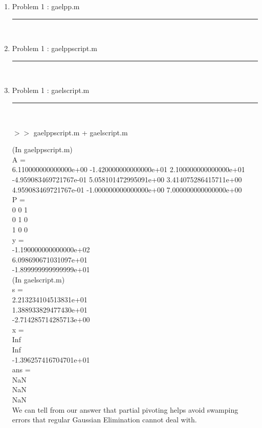 \documentclass[12pt]{article}
\newcommand*\lstinputpath[1]{\lstset{inputpath=#1}}
\begin{document}
	\begin{enumerate}
	
	\item[] Problem 1 : gaelpp.m \noindent\rule{\textwidth}{1.0pt} \\
	\lstinputpath{P1}
	
	
	\item[] Problem 1 : gaelppscript.m \noindent\rule{\textwidth}{1.0pt} \\
		
	
	\item[] Problem 1 : gaelscript.m \noindent\rule{\textwidth}{1.0pt} \\
		
	
	\pagebreak	
	
	$>>$ gaelppscript.m + gaelscript.m
	\begin{framed}
	(In gaelppscript.m)\\
	A =\\
     6.110000000000000e+00    -1.420000000000000e+01     2.100000000000000e+01\\
    -4.959083469721767e-01     5.058101472995091e+00     3.414075286415711e+00\\
     4.959083469721767e-01    -1.000000000000000e+00     7.000000000000000e+00\\


	P =\\
     0     0     1\\
     0     1     0\\
     1     0     0\\


	y =\\
    -1.190000000000000e+02\\
     6.098690671031097e+01\\
    -1.899999999999999e+01\\

(In gaelscript.m)\\
	s =\\
     2.213234104513831e+01\\
     1.388933829477430e+01\\
    -2.714285714285713e+00\\
    
    x =\\
                       Inf\\
                       Inf\\
    -1.396257416704701e+01\\


ans =\\
   NaN\\
   NaN\\
   NaN\\

We can tell from our answer that partial pivoting helps avoid swamping errors that regular Gaussian Elimination cannot deal with.
	\end{framed}
	
	\end{enumerate}
	
\end{document}
